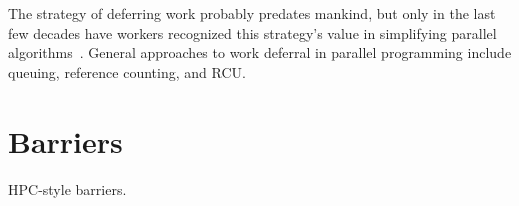 

The strategy of deferring work probably predates mankind, but only
in the last few decades have workers recognized this strategy's value
in simplifying parallel algorithms~\cite{Kung80,HMassalinPhD}.
General approaches to work deferral in parallel programming include
queuing, reference counting, and RCU.


\section{Barriers}
\label{sec:locking:Barriers}

HPC-style barriers.




